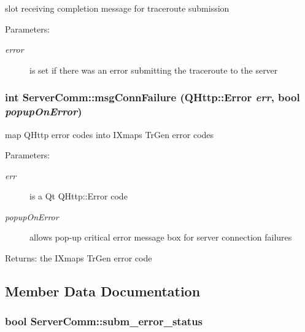 slot receiving completion message for traceroute submission \begin{Desc}
\item[Parameters:]
\begin{description}
\item[{\em error}]is set if there was an error submitting the traceroute to the server \end{description}
\end{Desc}
\hypertarget{classServerComm_90d964e211713d3b299dabd61708a294}{
\subsubsection[msgConnFailure]{\setlength{\rightskip}{0pt plus 5cm}int ServerComm::msgConnFailure (QHttp::Error {\em err}, \/  bool {\em popupOnError})}}
\label{classServerComm_90d964e211713d3b299dabd61708a294}


map QHttp error codes into IXmaps TrGen error codes \begin{Desc}
\item[Parameters:]
\begin{description}
\item[{\em err}]is a Qt QHttp::Error code \item[{\em popupOnError}]allows pop-up critical error message box for server connection failures \end{description}
\end{Desc}
\begin{Desc}
\item[Returns:]the IXmaps TrGen error code \end{Desc}


\subsection{Member Data Documentation}
\hypertarget{classServerComm_060b1a2c01b923b17dc8d9d3236be5a1}{
\subsubsection[subm\_\-error\_\-status]{\setlength{\rightskip}{0pt plus 5cm}bool {\bf ServerComm::subm\_\-error\_\-status}}}
\label{classServerComm_060b1a2c01b923b17dc8d9d3236be5a1}


